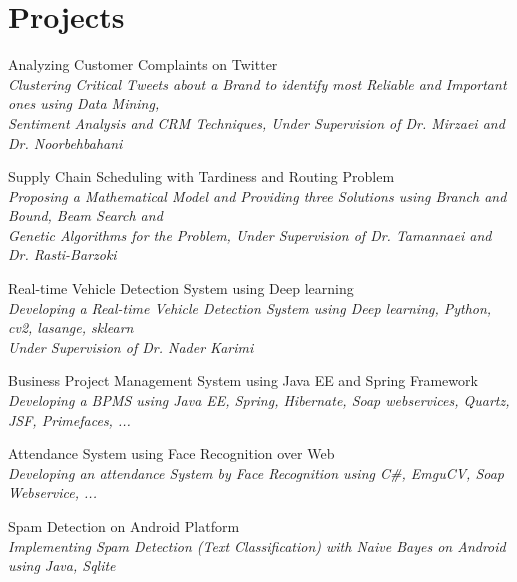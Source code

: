 \documentclass[a4paper,10pt]{article}
\newcommand{\projectTitle}[1]{
	\textbullet\textnormal{ #1}}
\newcommand{\projectSubTitle}[1]{
	\emph{\color{darkgray}\small {\space\space\space\space\space}#1}}
\newcommand{\linkSign}{
	{\footnotesize\space\faExternalLink}}
\newcommand{\twitterProject}{https://github.com/ImnIrdst/Clustering-Customer-Complaints-Twitter-2016}
\newcommand{\VRPProject}{https://github.com/ImnIrdst/VRP-Branch-and-Bound-2016}
\newcommand{\DeepLearningProject}{https://github.com/ImnIrdst/Sharif-Cup-2015-TiZii}
\newcommand{\BPMSProject}{https://github.com/ImnIrdst/VRP-Branch-and-Bound-2016}
\newcommand{\SpamDetectionProject}{https://github.com/ImnIrdst/Spam-Detection-on-Android-2015}
\begin{document}
	\section{Projects}
		\projectTitle{ Analyzing Customer Complaints on Twitter}\href{\twitterProject}{\linkSign}\\
		\projectSubTitle{Clustering Critical Tweets about a Brand to identify most Reliable and Important ones using Data Mining,} \\
		\projectSubTitle{Sentiment Analysis and CRM Techniques, Under Supervision of Dr. Mirzaei and Dr. Noorbehbahani} \vspace{1 mm} 
		
		\projectTitle{ Supply Chain Scheduling with Tardiness and Routing Problem} \href{\VRPProject}{\linkSign} \\
		\projectSubTitle{Proposing a Mathematical Model and Providing three Solutions using Branch and Bound, Beam Search and }\\
		\projectSubTitle{Genetic Algorithms for the Problem, Under Supervision of Dr. Tamannaei and Dr. Rasti-Barzoki}\vspace{1 mm}
		
		\projectTitle{ Real-time Vehicle Detection System using Deep learning} \href{\DeepLearningProject}{\linkSign} \\
		\projectSubTitle{Developing a Real-time Vehicle Detection System using Deep learning, Python, cv2, lasange, sklearn}\\
		\projectSubTitle{Under Supervision of Dr. Nader Karimi}\vspace{1 mm}
		
		\projectTitle{ Business Project Management System using Java EE and Spring Framework} \href{\BPMSProject}{\linkSign} \\
		\projectSubTitle{Developing a BPMS using Java EE, Spring, Hibernate, Soap webservices, Quartz, JSF, Primefaces, ...} \vspace{1 mm}
		
		\projectTitle{ Attendance System using Face Recognition over Web} \\
		\projectSubTitle{Developing an attendance System by Face Recognition using C\#, EmguCV, Soap Webservice, ...} \vspace{1 mm}

		\projectTitle{ Spam Detection on Android Platform} \href{\SpamDetectionProject}{\linkSign} \\
		\projectSubTitle{Implementing Spam Detection (Text Classification) with Naive Bayes on Android using Java, Sqlite} \vspace{1 mm}
		
\end{document}
